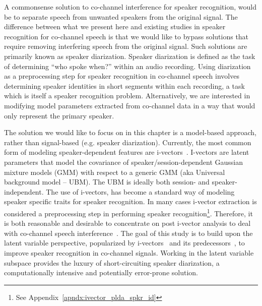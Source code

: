 A commonsense solution to co-channel interference for speaker recognition, would be to separate speech from unwanted speakers from the original signal. 
The difference between what we present here and existing studies in speaker recognition for co-channel speech is that we would like to bypass solutions that require removing interfering speech from the original signal. 
Such solutions are primarily known as speaker diarization. 
Speaker diarization is defined as the task of determining ``who spoke when?'' within an audio recording. 
Using diarization as a preprocessing step for speaker recognition in co-channel speech involves determining speaker identities in short segments within each recording, a task which is itself a speaker recognition problem.  
Alternatively, we are interested in modifying model parameters extracted from co-channel data in a way that would only represent the primary speaker. 

The solution we would like to focus on in this chapter is a model-based approach, rather than signal-based (e.g. speaker diarization). 
Currently, the most common form of modeling speaker-dependent features are i-vectors~\cite{dehak2011front}. 
I-vectors are latent parameters that model the covariance of speaker/session-dependent Gaussian mixture models (GMM) with respect to a generic GMM (aka Universal background model -- UBM).  
The UBM is ideally both session- and speaker-independent.
The use of i-vectors, has become a standard way of modeling speaker specific traits for speaker recognition. 
In many cases i-vector extraction is considered a preprocessing step in performing speaker recognition\footnote{See Appendix~\ref{apndx:ivector_plda_spkr_id}}. 
Therefore, it is both reasonable and desirable to concentrate on post i-vector analysis to deal with co-channel speech interference~\cite{ivector_challenge}. 
The goal of this study is to build upon the latent variable perspective, popularized by i-vectors~\cite{dehak2011front} and its predecessors~\cite{kenny2010bayesian}, to improve speaker recognition in co-channel signals. 
Working in the latent variable subspace provides the luxury of short-circuiting speaker diarization, a computationally intensive and potentially error-prone solution. 


